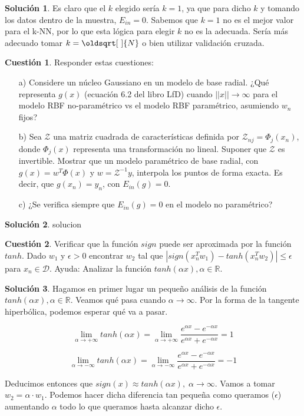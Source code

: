 \documentclass[a4paper, 11pt]{article}
\theoremstyle{definition}
\newtheorem{cuestion}{Cuestión}
\newtheorem*{solucion}{Solución}
\renewcommand*{\sqrt}[2][\ ]{\oldsqrt[#1]{#2} }
\begin{document}
  \begin{solucion}
    Es claro que el $k$ elegido sería $k=1$, ya que para dicho $k$ y tomando los datos dentro de la muestra, $E_{in}=0$. Sabemos que $k=1$ no es el mejor valor para el k-NN, por lo que esta lógica para elegir $k$ no es la adecuada. Sería más adecuado tomar $k=\sqrt{N}$ o bien utilizar validación cruzada.
  \end{solucion}

  \begin{cuestion}
    Responder estas cuestiones:
    \begin{enumerate}
      \item[a)] Considere un núcleo Gaussiano en un modelo de base radial. ¿Qué representa $g(x)$ (ecuación 6.2 del libro LfD) cuando $||x|| \rightarrow \infty$ para el modelo RBF no-paramétrico vs el modelo RBF paramétrico, asumiendo $w_n$ fijos?
      \item[b)] Sea $\mathcal{Z}$ una matriz cuadrada de características definida por $\mathcal{Z}_{nj}=\Phi_j(x_n)$, donde $\Phi_j(x)$ representa una transformación no lineal. Suponer que $\mathcal{Z}$ es invertible. Mostrar que un modelo paramétrico de base radial, con $g(x) = w^T\Phi(x)$ y $ w = \mathcal{Z}^{-1}y $, interpola los puntos de forma exacta. Es decir, que $g(x_n) = y_n$, con $E_{in}(g) = 0$.
      \item[c)] ¿Se verifica siempre que $E_{in}(g) = 0$ en el modelo no paramétrico?
    \end{enumerate}
  \end{cuestion}

  \begin{solucion}
    solucion
  \end{solucion}

  \begin{cuestion}
    Verificar que la función $sign$ puede ser aproximada por la función $tanh$. Dado $w_1$ y $\epsilon > 0$ encontrar $w_2$ tal que $|sign(x_n^Tw_1) - tanh(x_n^Tw_2)| \leq \epsilon$ para $x_n \in \mathcal{D}$. Ayuda: Analizar la función $tanh(\alpha x), \alpha \in \mathbb{R}$.
  \end{cuestion}

  \begin{solucion}
    Hagamos en primer lugar un pequeño análisis de la función $tanh(\alpha x), \alpha \in \mathbb{R}$. Veamos qué pasa cuando $\alpha \rightarrow \infty$. Por la forma de la tangente hiperbólica, podemos esperar qué va a pasar.

    \[
      \lim_{\alpha \rightarrow + \infty} tanh(\alpha x) = \lim_{\alpha \rightarrow + \infty} \frac{e^{\alpha x} - e^{-\alpha x}}{e^{\alpha x} + e^{-\alpha x}} = 1
    \]

    \[
      \lim_{\alpha \rightarrow - \infty} tanh(\alpha x) = \lim_{\alpha \rightarrow - \infty} \frac{e^{\alpha x} - e^{-\alpha x}}{e^{\alpha x} + e^{-\alpha x}} = -1
    \]

    Deducimos entonces que $sign(x) \approx tanh(\alpha x), \; \alpha \rightarrow \infty$. Vamos a tomar $w_2 = \alpha \cdot w_1$. Podemos hacer dicha diferencia tan pequeña como queramos ($\epsilon$) aumentando $\alpha$ todo lo que queramos hasta alcanzar dicho $\epsilon$.
  \end{solucion}
\end{document}

